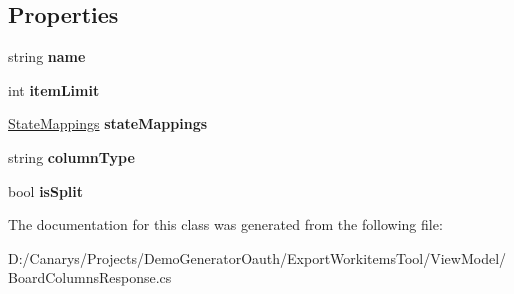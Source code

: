 \subsection*{Properties}
\begin{DoxyCompactItemize}
\item 
\mbox{\label{class_templates_generator_tool_1_1_view_model_1_1_board_columns_response_1_1_column_aa8111ed15ac9e3c0d7a5c224f0837dcd}} 
string {\bfseries name}
\item 
\mbox{\label{class_templates_generator_tool_1_1_view_model_1_1_board_columns_response_1_1_column_aaebf0ec2d661ff37c5c8802671896860}} 
int {\bfseries item\+Limit}
\item 
\mbox{\label{class_templates_generator_tool_1_1_view_model_1_1_board_columns_response_1_1_column_ac8cb20d9f0ceaa892523791230162d90}} 
\mbox{\hyperlink{class_templates_generator_tool_1_1_view_model_1_1_board_columns_response_1_1_state_mappings}{State\+Mappings}} {\bfseries state\+Mappings}
\item 
\mbox{\label{class_templates_generator_tool_1_1_view_model_1_1_board_columns_response_1_1_column_a20e4167c3d72559af050f90a8192c3d5}} 
string {\bfseries column\+Type}
\item 
\mbox{\label{class_templates_generator_tool_1_1_view_model_1_1_board_columns_response_1_1_column_a6d2a33f854250e2427a7f54ca8365db0}} 
bool {\bfseries is\+Split}
\end{DoxyCompactItemize}


The documentation for this class was generated from the following file\+:\begin{DoxyCompactItemize}
\item 
D\+:/\+Canarys/\+Projects/\+Demo\+Generator\+Oauth/\+Export\+Workitems\+Tool/\+View\+Model/Board\+Columns\+Response.\+cs\end{DoxyCompactItemize}
